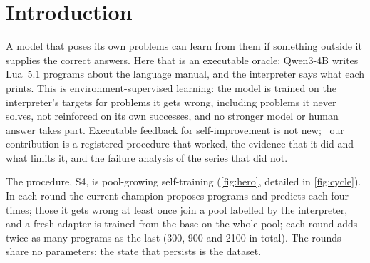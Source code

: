 
\section{Introduction}\label{sec:intro}

A model that poses its own problems can learn from them if something outside it supplies the correct
answers. Here that is an executable oracle: Qwen3-4B writes Lua~5.1 programs about the language manual,
and the interpreter says what each prints. This is environment-supervised learning: the model is trained
on the interpreter's targets for problems it gets wrong, including problems it never solves, not
reinforced on its own successes, and no stronger model or human answer takes part. Executable feedback
for self-improvement is not new;~\citep{haluptzok2022} our contribution is a registered procedure
that worked, the evidence that it did and what limits it, and the failure analysis of the series that
did not.

The procedure, S4, is pool-growing self-training (\cref{fig:hero}, detailed in \cref{fig:cycle}). In
each round the current champion proposes programs and predicts each four times; those it gets wrong at
least once join a pool labelled by the interpreter, and a fresh adapter is trained from the base on the
whole pool; each round adds twice as many programs as the last (300, 900 and 2100 in total). The rounds share no
parameters; the state that persists is the dataset.

\begin{center}
\end{center}

